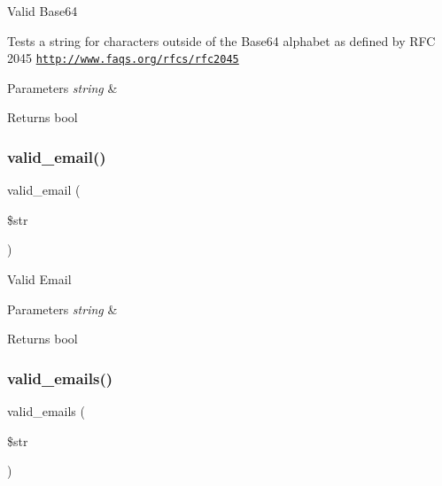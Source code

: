 Valid Base64

Tests a string for characters outside of the Base64 alphabet as defined by R\+FC 2045 \href{http://www.faqs.org/rfcs/rfc2045}{\tt http\+://www.\+faqs.\+org/rfcs/rfc2045}


\begin{DoxyParams}{Parameters}
{\em string} & \\
\hline
\end{DoxyParams}
\begin{DoxyReturn}{Returns}
bool 
\end{DoxyReturn}
\mbox{\label{class_c_i___form__validation_af7d43edae9c6e388390176b3c62de140}} 
\subsubsection{\texorpdfstring{valid\+\_\+email()}{valid\_email()}}
{\footnotesize\ttfamily valid\+\_\+email (\begin{DoxyParamCaption}\item[{}]{\$str }\end{DoxyParamCaption})}

Valid Email


\begin{DoxyParams}{Parameters}
{\em string} & \\
\hline
\end{DoxyParams}
\begin{DoxyReturn}{Returns}
bool 
\end{DoxyReturn}
\mbox{\label{class_c_i___form__validation_a7692019b59978c17621e3920823621c4}} 
\subsubsection{\texorpdfstring{valid\+\_\+emails()}{valid\_emails()}}
{\footnotesize\ttfamily valid\+\_\+emails (\begin{DoxyParamCaption}\item[{}]{\$str }\end{DoxyParamCaption})}

